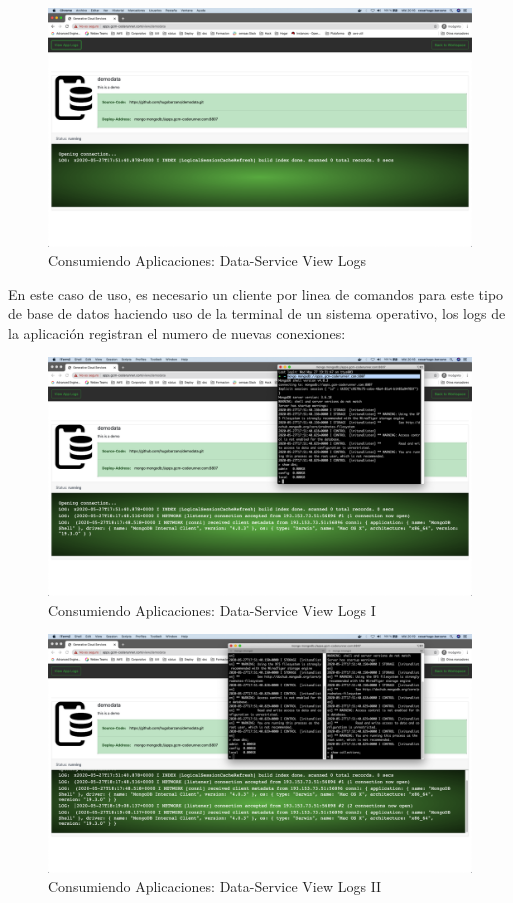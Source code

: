 \documentclass[a4paper,11pt]{book}
\begin{document}
\begin{figure}[H]
\centering
\includegraphics[scale=0.2]{imagenes/casouso/1_13.png}
\caption{ Consumiendo Aplicaciones: Data-Service View Logs  }
\end{figure}

En este caso de uso, es necesario un cliente por linea de comandos para este tipo de base de datos haciendo uso de la terminal de un sistema operativo, los logs de la aplicación registran el numero de nuevas conexiones: 

\begin{figure}[H]
\centering
\includegraphics[scale=0.2]{imagenes/casouso/1_14.png}
\caption{  Consumiendo Aplicaciones: Data-Service View Logs I  }
\end{figure}

\begin{figure}[H]
\centering
\includegraphics[scale=0.2]{imagenes/casouso/1_15.png}
\caption{  Consumiendo Aplicaciones: Data-Service View Logs II }
\end{figure}
\end{document}

